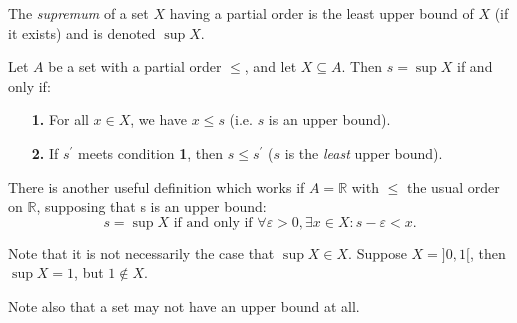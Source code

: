 \documentclass{article}
\renewcommand{\leq}{\leqslant}
\begin{document}
The \emph{supremum} of a set $X$ having a partial order is the least upper bound of $X$ (if it exists) and is denoted $\sup{X}$.

Let $A$ be a set with a partial order $\leq$, and let $X \subseteq A$. Then $s = \sup X$ if and only if: \begin{enumerate}
\item[\textbf{1.}]{For all $x\in X$, we have $x \leq s$ (i.e. $s$ is an upper bound).}
\item[\textbf{2.}]{If $s^{\prime}$ meets condition \textbf{1}, then $s \leq s^{\prime}$ ($s$ is the \emph{least} upper bound).}
\end{enumerate}

There is another useful definition which works if $A = \mathbb{R}$ with $\leq$ the usual order on $\mathbb{R}$, supposing that s is an upper bound: \[s = \sup X \text{ if and only if } \forall \varepsilon > 0, \exists x\in X : s-\varepsilon < x.\]  

Note that it is not necessarily the case that $\sup X \in X$.  Suppose $X = {]0, 1[}$, then $\sup X = 1$, but $1 \not\in X$.

Note also that a set may not have an upper bound at all.
\end{document}
